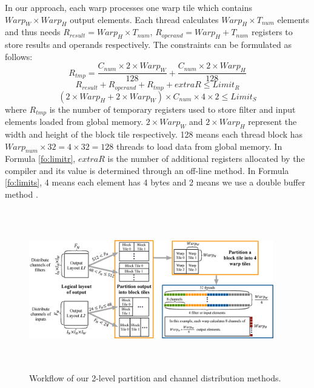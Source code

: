 In our approach, each warp processes one warp tile which contains $Warp_W \times Warp_H$ output elements.
Each thread calculates $Warp_H \times T_{num}$ elements and thus needs $R_{result}=Warp_H \times T_{num}$, $R_{operand}=Warp_H+T_{num}$ registers to store results and operands respectively.
The constraints can be formulated as follows:
\begin{equation}\nonumber
R_{tmp}=\frac{C_{num} \times 2 \times Warp_W}{128}+\frac{C_{num}  \times 2 \times Warp_H}{128}
\end{equation}
\begin{equation}
    \label{fo:limitr}
R_{result}+R_{operand}+R_{tmp}+extraR \leq Limit_R
\end{equation}
\begin{equation}
    \label{fo:limits}
(2 \times Warp_H+2 \times Warp_W)\times C_{num} \times 4 \times 2 \leq Limit_S
\end{equation}
where $R_{tmp}$ is the number of temporary registers used to store filter and input elements loaded from global memory.
$2 \times Warp_W$ and $2 \times Warp_H$ represent the width and height of the block tile respectively. 128 means each thread block has $Warp_{num} \times 32 = 4 \times 32=128$ threads to load data from global memory. 
In Formula \ref{fo:limitr}, $extraR$ is the number of additional registers allocated by the compiler and its value is determined through an off-line method. In Formula \ref{fo:limits}, 4 means each element has 4 bytes and 2 means we use a double buffer method \cite{abdelfattah2019fast,nichols2019magmadnn}.
\begin{figure}
	\centering
    \includegraphics[width=0.95\textwidth,height=7cm]{./figure/pwworkflow.eps}
    \vspace{-3mm}
    \caption{Workflow of our 2-level partition and channel distribution methods.} \label{fig:pwworkflow}
\end{figure}
